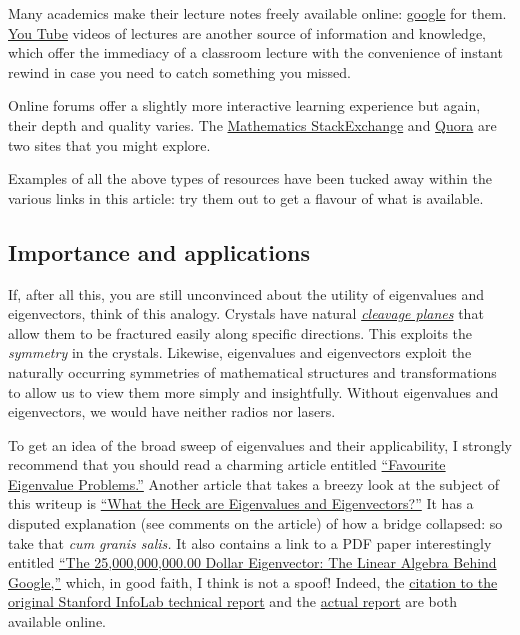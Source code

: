 \documentclass[
  12pt,
  a4paper,
]{article}
\begin{document}
Many academics make their lecture notes freely available online:
\href{https://www.google.com/}{google} for them.
\href{https://www.youtube.com/}{You Tube} videos of lectures are another
source of information and knowledge, which offer the immediacy of a
classroom lecture with the convenience of instant rewind in case you
need to catch something you missed.

Online forums offer a slightly more interactive learning experience but
again, their depth and quality varies. The
\href{http://math.stackexchange.com/}{Mathematics StackExchange} and
\href{https://www.quora.com/}{Quora} are two sites that you might
explore.

Examples of all the above types of resources have been tucked away
within the various links in this article: try them out to get a flavour
of what is available.

\hypertarget{importance-and-applications}{%
\subsection{Importance and
applications}\label{importance-and-applications}}

If, after all this, you are still unconvinced about the utility of
eigenvalues and eigenvectors, think of this analogy. Crystals have
natural
\href{https://en.wikipedia.org/wiki/Cleavage_\%28crystal\%29}{\emph{cleavage
planes}} that allow them to be fractured easily along specific
directions. This exploits the \emph{symmetry} in the crystals. Likewise,
eigenvalues and eigenvectors exploit the naturally occurring symmetries
of mathematical structures and transformations to allow us to view them
more simply and insightfully. Without eigenvalues and eigenvectors, we
would have neither radios nor lasers.

To get an idea of the broad sweep of eigenvalues and their
applicability, I strongly recommend that you should read a charming
article entitled
\href{http://people.maths.ox.ac.uk/trefethen/dec11.pdf}{``Favourite
Eigenvalue Problems.''} Another article that takes a breezy look at the
subject of this writeup is
\href{http://hubpages.com/education/What-the-Heck-are-Eigenvalues-and-Eigenvectors}{``What
the Heck are Eigenvalues and Eigenvectors?''} It has a disputed
explanation (see comments on the article) of how a bridge collapsed: so
take that \emph{cum granis salis.} It also contains a link to a PDF
paper interestingly entitled
\href{http://www.rose-hulman.edu/~bryan/googleFinalVersionFixed.pdf}{``The
25,000,000,000.00 Dollar Eigenvector: The Linear Algebra Behind
Google,''} which, in good faith, I think is not a spoof! Indeed, the
\href{http://ilpubs.stanford.edu:8090/422/}{citation to the original
Stanford InfoLab technical report} and the
\href{http://ilpubs.stanford.edu:8090/422/1/1999-66.pdf}{actual report}
are both available online.
\end{document}
